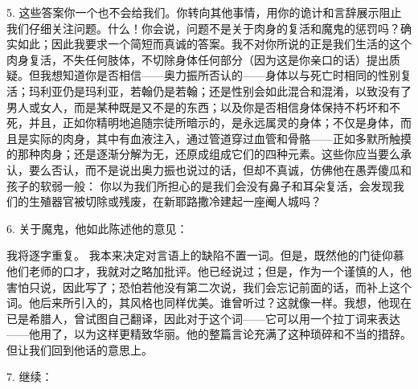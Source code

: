 5. 这些答案你一个也不会给我们。你转向其他事情，用你的诡计和言辞展示阻止我们仔细关注问题。什么！你会说，问题不是关于肉身的复活和魔鬼的惩罚吗？确实如此；因此我要求一个简短而真诚的答案。我不对你所说的正是我们生活的这个肉身复活，不失任何肢体，不切除身体任何部分（因为这是你亲口的话）提出质疑。但我想知道你是否相信——奥力振所否认的——身体以与死亡时相同的性别复活；玛利亚仍是玛利亚，若翰仍是若翰；还是性别会如此混合和混淆，以致没有了男人或女人，而是某种既是又不是的东西；以及你是否相信身体保持不朽坏和不死，并且，正如你精明地追随宗徒所暗示的，是永远属灵的身体；不仅是身体，而且是实际的肉身，其中有血液注入，通过管道穿过血管和骨骼——正如多默所触摸的那种肉身；还是逐渐分解为无，还原成组成它们的四种元素。这些你应当要么承认，要么否认，而不是说出奥力振也说过的话，但却不真诚，仿佛他在愚弄傻瓜和孩子的软弱一般： 你以为我们所担心的是我们会没有鼻子和耳朵复活，会发现我们的生殖器官被切除或残废，在新耶路撒冷建起一座阉人城吗？\par

6. 关于魔鬼，他如此陈述他的意见：\par

\par

我将逐字重复。 我本来决定对言语上的缺陷不置一词。但是，既然他的门徒仰慕他们老师的口才，我就对之略加批评。他已经说过；但是，作为一个谨慎的人，他害怕只说，因此写了；恐怕若他没有第二次说，我们会忘记前面的话，而补上这个词。他后来所引入的，其风格也同样优美。谁曾听过？这就像一样。我想，他现在已是希腊人，曾试图自己翻译，因此对于这个词——它可以用一个拉丁词来表达——他用了，以为这样更精致华丽。他的整篇言论充满了这种琐碎和不当的措辞。但让我们回到他话的意思上。\par

7. 继续：\par

